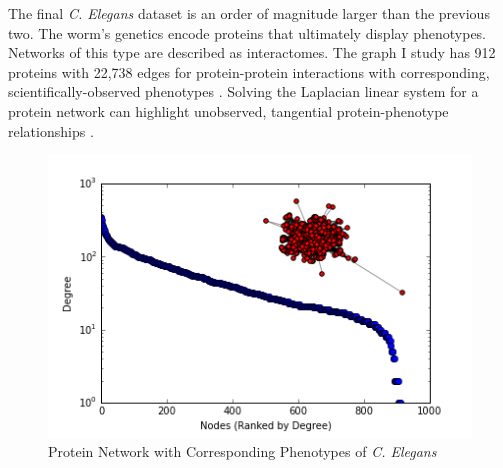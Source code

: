 \documentclass{article}
\begin{document}
The final \textit{C. Elegans} dataset is an order of magnitude larger than the previous two. The worm's genetics encode proteins that ultimately display phenotypes. Networks of this type are described as interactomes. The graph I study has 912 proteins with 22,738 edges for protein-protein interactions with corresponding, scientifically-observed phenotypes \cite{Simonis:2009}. Solving the Laplacian linear system for a protein network can highlight unobserved, tangential protein-phenotype relationships \cite{Gleich:2015}.

\begin{figure}
\centering

\includegraphics[width=\linewidth]{gene_degree_histogram.png}
\caption{Protein Network with Corresponding Phenotypes of \textit{C. Elegans}}
  
\end{figure}
\end{document}
